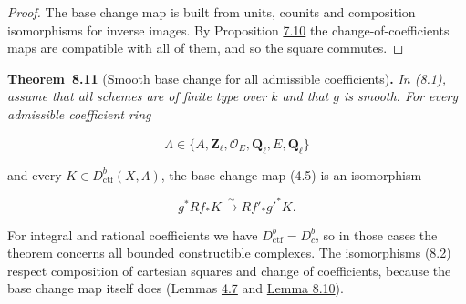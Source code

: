 \documentclass[11pt]{article}
\newenvironment{bpstatement}[2]{\par\addvspace{0.6\baselineskip}\noindent\textbf{#1}#2\textbf{.}\enspace\ignorespaces}
  {\par\addvspace{0.4\baselineskip}}
\newenvironment{bpstatementit}[2]{\begin{bpstatement}{#1}{#2}\itshape\ignorespaces}{\end{bpstatement}}
\providecommand{\Dbc}{}\renewcommand{\Dbc}{D^b_c}
\begin{document}
\begin{proof}[{Proof}]\label{bp680}%
The base change map is built from units, counits and composition isomorphisms for inverse images. By Proposition \hyperref[bp626]{7.10} the change-of-coefficients maps are compatible with all of them, and so the square commutes.
\end{proof}

\label{bp681}%
\begin{bpstatementit}{Theorem~8.11}{ (Smooth base change for all admissible coefficients)}
In (8.1), assume that all schemes are of finite type over \(k\) and that \(g\) is smooth. For every admissible coefficient ring

\[
\Lambda\in\{A,\mathbf Z_\ell,\mathcal O_E,\mathbf Q_\ell,E,\overline{\mathbf Q}_\ell\}
\]

and every \(K\in D^b_{\mathrm{ctf}}(X,\Lambda)\), the base change map (4.5) is an isomorphism

\[
g^*Rf_*K\xrightarrow{\sim}Rf'_*g'^*K.
\tag{8.2}
\]
\end{bpstatementit}

\label{bp682}%
For integral and rational coefficients we have \(D^b_{\mathrm{ctf}}=\Dbc\), so in those cases the theorem concerns all bounded constructible complexes. The isomorphisms (8.2) respect composition of cartesian squares and change of coefficients, because the base change map itself does (Lemmas \hyperref[bp304]{4.7} and \hyperref[bp679]{Lemma 8.10}).
\end{document}
